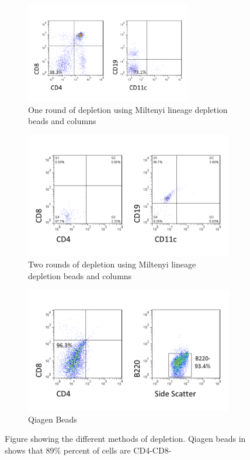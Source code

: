 \begin{figure}
	\begin{subfigure}{\textwidth}
	\includegraphics[width=0.8\textwidth]{Figures/1rounddepletion.png}
	\caption{One round of depletion using Miltenyi lineage depletion beads and columns}
	\end{subfigure}
	\hfill
	\begin{subfigure}{0.8\textwidth}
	\includegraphics[width=\textwidth]{Figures/2rounddepletion.png}
	\caption{Two rounds of depletion using Miltenyi lineage depletion beads and columns}
	\label{subfig:2miltenyi}
	\end{subfigure}
	\hfill
	\begin{subfigure}{0.8\textwidth}
	\includegraphics[width=\textwidth] {Figures/Qiagenbeads.png}
	\caption{Qiagen Beads}
	\label{subfig:Qiagen}
	\end{subfigure}
	
\caption{Figure showing the different methods of depletion. Qiagen beads in shows that 89\% percent of cells are CD4-CD8-}
\end{figure}

